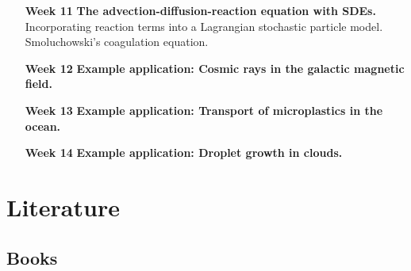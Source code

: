 \documentclass{article}
\begin{document}
\begin{itemize}
    \item[{\bf Week 11}] {\bf The advection-diffusion-reaction equation with SDEs.} Incorporating reaction terms into a Lagrangian stochastic particle model. Smoluchowski's coagulation equation.
    \item[{\bf Week 12}] {\bf Example application: Cosmic rays in the galactic magnetic field.}
    \item[{\bf Week 13}] {\bf Example application: Transport of microplastics in the ocean.}
    \item[{\bf Week 14}] {\bf Example application: Droplet growth in clouds.}
\end{itemize}

\section{Literature}

\subsection{Books}
\end{document}
